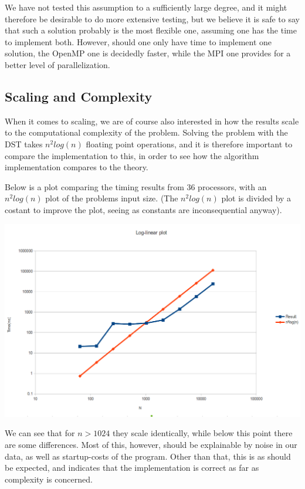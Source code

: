 \documentclass[fontsize=11pt,paper=a4,titlepage]{article}
\begin{document}
We have not tested this assumption to a sufficiently large degree, and it might therefore be desirable to do more extensive testing, but we believe it is safe to say that such a solution probably is the most flexible one, assuming one has the time to implement both. However, should one only have time to implement one solution, the OpenMP one is decidedly faster, while the MPI one provides for a better level of parallelization.

\subsection{Scaling and Complexity}
When it comes to scaling, we are of course also interested in how the results scale to the computational complexity of the problem. Solving the problem with the DST takes $n^2log(n)$ floating point operations, and it is therefore important to compare the implementation to this, in order to see how the algorithm implementation compares to the theory.

Below is a plot comparing the timing results from 36 processors, with an $n^2log(n)$ plot of the problems input size. (The $n^2log(n)$ plot is divided by a costant to improve the plot, seeing as constants are inconsequential anyway).

\hspace*{-1cm}\includegraphics[scale=0.55]{pics/logplot.png}

We can see that for $n > 1024$ they scale identically, while below this point
there are some differences. Most of this, however, should be explainable by
noise in our data, as well as startup-costs of the program. Other than that,
this is as should be expected, and indicates that the implementation is correct
as far as complexity is concerned.
\end{document}
